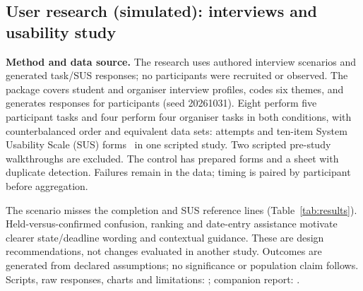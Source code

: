 \subsection{User research (simulated): interviews and usability study}\label{sec:study}
\textbf{Method and data source.} The research uses authored interview scenarios and generated task/SUS responses;
no participants were recruited or observed. The package covers
\SimInterviewStudents{} student and \SimInterviewOrganisers{} organiser interview profiles, codes
six themes, and generates responses for \SimStudyN{} participants (seed 20261031).
Eight perform five participant tasks and four perform four organiser tasks in both conditions,
with counterbalanced order and equivalent data sets: \SimTaskAttempts{} attempts and \SimSusForms{}
ten-item System Usability Scale (SUS) forms~\cite{brooke1996sus} in one scripted study. Two scripted pre-study walkthroughs are
excluded. The control has prepared forms and a sheet with duplicate detection. Failures remain in
the data; timing is paired by participant before aggregation.

The scenario misses the completion and SUS reference lines (Table~\ref{tab:results}). Held-versus-confirmed confusion,
ranking and date-entry assistance motivate clearer state/deadline wording and contextual guidance.
These are design recommendations, not changes evaluated in another study. Outcomes are generated
from declared assumptions; no significance or population claim follows.
Scripts, raw responses, charts and limitations: ; companion report:
.

